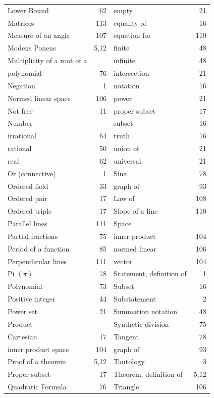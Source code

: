 \newpage
\lhead{}
\begin{tabular}{l r l r}
Lower Bound &62&\q empty &21\\
Matrices&113&\q equality of& 16\\
Measure of an angle& 107& \q equation for& 110\\
Modens Ponens& 5,12&\q finite& 48\\
Multiplicity of a root of a&& \q infinite &48\\
\q polynomial& 76&\q  intersection &21\\
Negation& 1& \q notation &16\\
Normed linear space& 106&\q power& 21\\
Not free & 11&\q proper subset& 17\\
Number& & \q subset& 16\\
\q irrational &64& \q truth &16\\
\q rational& 50&\q union of& 21\\
\q real& 62 &\q universal &21\\
Or (connective)& 1& Sine& 78\\
Ordered field& 33 &\q graph of &93\\
Ordered pair &17& \q Law of &108\\
Ordered triple& 17 &Slope of a line &110\\
Parallel lines& 111& Space&\\
Partial fractions& 75& \q inner product& 104\\
Period of a function &85& \q  normed linear& 106\\
Perpendicular lines &111& \q vector &104\\
Pi $(\pi)$ &78& Statement, definition of& 1\\
Polynomial& 73& Subset& 16\\
Positive integer& 44& Substatement &2\\
Power set& 21 &Summation notation& 48\\
Product && Synthetic division &75\\
\q Cartesian& 17 &Tangent &78\\
\q inner product space& 104& \q graph of& 93\\
Proof of a theorem &5,12& Tautology& 3\\
Proper subset& 17 &Theorem, definition of& 5,12\\
Quadratic Formula&76&Triangle&106\\

\end{tabular}
